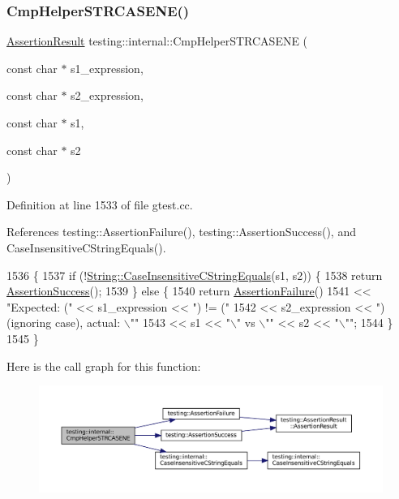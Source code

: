 \subsubsection{\texorpdfstring{Cmp\+Helper\+S\+T\+R\+C\+A\+S\+E\+N\+E()}{CmpHelperSTRCASENE()}}
{\footnotesize\ttfamily \hyperlink{classtesting_1_1AssertionResult}{Assertion\+Result} testing\+::internal\+::\+Cmp\+Helper\+S\+T\+R\+C\+A\+S\+E\+NE (\begin{DoxyParamCaption}\item[{const char $\ast$}]{s1\+\_\+expression,  }\item[{const char $\ast$}]{s2\+\_\+expression,  }\item[{const char $\ast$}]{s1,  }\item[{const char $\ast$}]{s2 }\end{DoxyParamCaption})}



Definition at line 1533 of file gtest.\+cc.



References testing\+::\+Assertion\+Failure(), testing\+::\+Assertion\+Success(), and Case\+Insensitive\+C\+String\+Equals().


\begin{DoxyCode}
1536                                                    \{
1537   \textcolor{keywordflow}{if} (!\hyperlink{namespacetesting_1_1internal_aebfd0cd34de52d7973a5b2d03ba848cf}{String::CaseInsensitiveCStringEquals}(s1, s2)) \{
1538     \textcolor{keywordflow}{return} \hyperlink{namespacetesting_ac1d0baedb17286c5c6c87bd1a45da8ac}{AssertionSuccess}();
1539   \} \textcolor{keywordflow}{else} \{
1540     \textcolor{keywordflow}{return} \hyperlink{namespacetesting_a75cb789614cb1c28c34627a4a3c053df}{AssertionFailure}()
1541         << \textcolor{stringliteral}{"Expected: ("} << s1\_expression << \textcolor{stringliteral}{") != ("}
1542         << s2\_expression << \textcolor{stringliteral}{") (ignoring case), actual: \(\backslash\)""}
1543         << s1 << \textcolor{stringliteral}{"\(\backslash\)" vs \(\backslash\)""} << s2 << \textcolor{stringliteral}{"\(\backslash\)""};
1544   \}
1545 \}
\end{DoxyCode}
Here is the call graph for this function\+:
\nopagebreak
\begin{figure}[H]
\begin{center}
\leavevmode
\includegraphics[width=350pt]{namespacetesting_1_1internal_a7e31d489f06ab8f6a81a7729f0c377e7_cgraph}
\end{center}
\end{figure}
\mbox{\label{namespacetesting_1_1internal_a711a396ed8f636ecd14a850a89d181b6}} 
